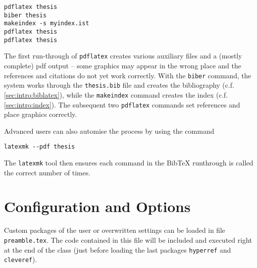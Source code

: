 \begin{verbatim}
pdflatex thesis
biber thesis
makeindex -s myindex.ist
pdflatex thesis
pdflatex thesis
\end{verbatim}

The first run-through of \texttt{pdflatex} creates various auxiliary files and a (mostly complete) pdf output -- some graphics may appear in the wrong place and the references and citations do not yet work correctly. With the \texttt{biber} command, the system works through the \texttt{thesis.bib} file and creates the bibliography (c.f. \cref{sec:intro:biblatex}), while the \texttt{makeindex} command creates the index (c.f. \cref{sec:intro:index}). The subsequent two \texttt{pdflatex} commands set references and place graphics correctly.

Advanced users can also automise the process by using the command
\begin{verbatim}
latexmk --pdf thesis
\end{verbatim}
The \texttt{latexmk} tool then ensures each command in the Bib\TeX{} runthrough is called the correct number of times.

\section{Configuration and Options}
\label{sec:intro:options}
Custom packages of the user or overwritten settings can be loaded in file \texttt{preamble.tex}. The code contained in this file will be included and executed right at the end of the class (just before loading the last packages \texttt{hyperref} and \texttt{cleveref}).

